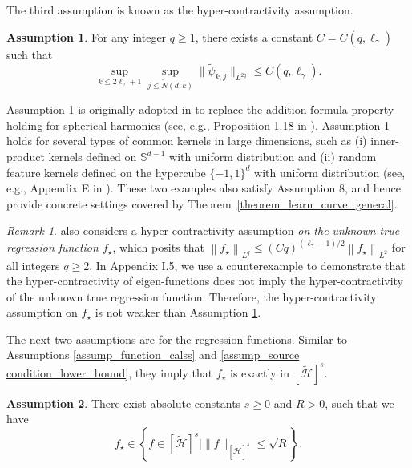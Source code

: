 \documentclass{article}
\theoremstyle{plain}
\theoremstyle{definition}
\newtheorem{assumption}{Assumption} %
\theoremstyle{remark}
\newtheorem{remark}[theorem]{Remark}
\newcommand{\calH}{\mathcal{H}}
\begin{document}
The third assumption is known as the hyper-contractivity assumption.


\begin{assumption}\label{assump_hyper_contractivity}
    For any integer $q \geq 1$, there exists a constant $C=C(q, \ell_{\gamma})$ such that
$$
\sup_{k \leq 2\ell_{\gamma}+1} \sup_{j \leq \tilde{N}(d, k)} \|\tilde{\psi}_{k, j}\|_{L^{2q}} \leq C(q, \ell_{\gamma}).
$$
\end{assumption}

Assumption \ref{assump_hyper_contractivity} is originally adopted in \cite{mei2022generalization, misiakiewicz2024non} to replace the addition formula property holding for spherical harmonics (see, e.g., Proposition 1.18 in \cite{gallier2009notes}). 
Assumption \ref{assump_hyper_contractivity} holds for several types of common kernels in large dimensions, such as (i) inner-product kernels defined on $\mathbb{S}^{d-1}$ with uniform distribution and (ii) random feature kernels defined on the hypercube $\{-1, 1\}^{d}$ with uniform distribution (see, e.g., Appendix E in \cite{mei2022generalization}). 
These two examples also satisfy Assumption 8, and hence provide concrete settings covered by Theorem~\ref{theorem_learn_curve_general}.



\begin{remark}
    \cite{misiakiewicz2024non} also considers a hyper-contractivity assumption \textit{on the unknown true regression function $f_{\star}$}, which posits that $\left\|f_{\star}\right\|_{L^q} \leq (C q)^{(\ell_{\gamma}+1) / 2}\left\|f_{\star}\right\|_{L^2}$ for all integers $q \geq 2$. In Appendix I.5, we use a counterexample to demonstrate that the hyper-contractivity of eigen-functions does not imply the hyper-contractivity of the unknown true regression function.
    Therefore, the hyper-contractivity assumption on $f_{\star}$ is not weaker than Assumption \ref{assump_hyper_contractivity}.
\end{remark}









The next two assumptions are for the regression functions. 
Similar to Assumptions \ref{assump_function_calss} and \ref{assump_source condition_lower_bound}, they imply that $f_{\star}$ is exactly in $[\tilde{\calH}]^{s}$.

\begin{assumption}\label{assump_function_calss_general}
There exist absolute constants $s \geq 0$ and $R>0$, such that we have
    \begin{equation*}
    f_{\star} \in 
    \left\{f \in [\tilde{\calH}]^{s} \mid \|f\|_{[\tilde{\calH}]^{s}} \leq \sqrt{R}\right\}.
\end{equation*}
\end{assumption}
\end{document}
